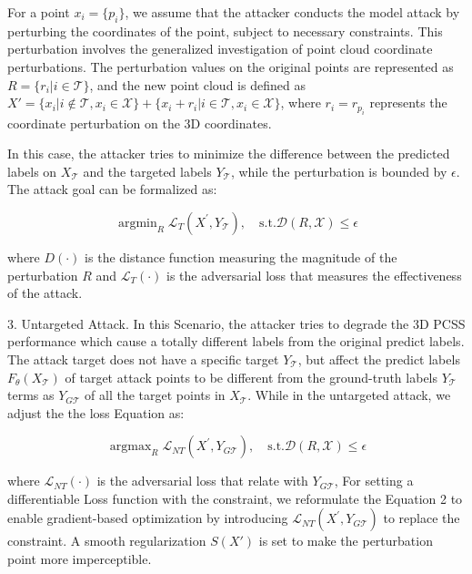 \documentclass[conference]{IEEEtran}
\begin{document}
For a point $x_i=\{p_i\}$, we assume that the attacker conducts the model attack by perturbing the coordinates of the point, subject to necessary constraints. This perturbation involves the generalized investigation of point cloud coordinate perturbations. The perturbation values on the original points are represented as $R=\{r_i|i\in \mathcal{T}\}$, and the new point cloud is defined as $X'=\{x_i|i\notin \mathcal{T},x_i\in \mathcal{X}\}+\{x_i+r_i|i\in \mathcal{T},x_i\in \mathcal{X}\}$, where $r_i=r_{p_i}$ represents the coordinate perturbation on the 3D coordinates.

In this case, the attacker tries to minimize the difference between the predicted labels on $X_\mathcal{T}$ and the targeted labels $Y_\mathcal{T}$, while the perturbation is bounded by $\epsilon $. The attack goal can be formalized as:

\begin{equation}
\mathop{\mathrm{argmin}}_{R}\mathcal{L}_{T}(X^{\prime},Y_{\mathcal{T}}),\quad \mathrm{s.t.}\mathcal{D}(R,\mathcal{X})\leq\epsilon    
\end{equation}


where $D(\cdot)$ is the distance function measuring the magnitude of the perturbation $R$ and $\mathcal{L}_T(\cdot)$ is the adversarial loss that measures the effectiveness of the attack. 

$3$. Untargeted Attack. In this Scenario, the attacker tries to degrade the 3D PCSS performance which cause a totally different labels from the original predict labels. The attack target does not have a specific target $Y_\mathcal{T}$, but affect the predict labels  $F_{\theta}(X_\mathcal{T})$ of target attack points to be different from the ground-truth labels $Y_\mathcal{T}$ terms as  $Y_{G\mathcal{T}}$ of  all the target points in $X_\mathcal{T}$. While in the untargeted attack, we adjust the the loss Equation as:

\begin{equation}
\mathop{\mathrm{argmax}}_{R}\mathcal{L}_{NT}(X^{\prime},Y_{G\mathcal{T}}),\quad \mathrm{s.t.}\mathcal{D}(R,\mathcal{X})\leq\epsilon    
\end{equation}

where $\mathcal{L}_{NT}(\cdot)$ is the adversarial loss that relate with $Y_{G\mathcal{T}}$, For setting a differentiable Loss function with the constraint, we reformulate the Equation 2 to enable gradient-based optimization by introducing $\mathcal{L}_{NT}(X^{\prime},Y_{G\mathcal{T}})$ to replace the constraint. A smooth regularization $S(X')$ is set to make the perturbation point more imperceptible.
\end{document}
